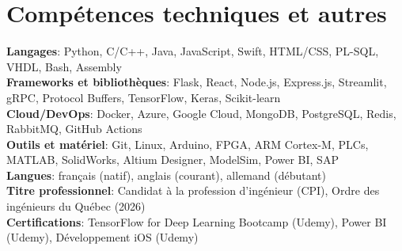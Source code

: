 \documentclass[letterpaper,12pt]{article}
\begin{document}
\section{Comp\'{e}tences techniques et autres}
 \begin{itemize}[leftmargin=0.15in, label={}]
    \small{\item{
     \textbf{Langages}{: Python, C/C++, Java, JavaScript, Swift, HTML/CSS, PL-SQL, VHDL, Bash, Assembly} \\
     \textbf{Frameworks et biblioth\`{e}ques}{: Flask, React, Node.js, Express.js, Streamlit, gRPC, Protocol Buffers, TensorFlow, Keras, Scikit-learn} \\
     \textbf{Cloud/DevOps}{: Docker, Azure, Google Cloud, MongoDB, PostgreSQL, Redis, RabbitMQ, GitHub Actions} \\
     \textbf{Outils et mat\'{e}riel}{: Git, Linux, Arduino, FPGA, ARM Cortex-M, PLCs, MATLAB, SolidWorks, Altium Designer, ModelSim, Power BI, SAP} \\
     \textbf{Langues}{: fran\c{c}ais (natif), anglais (courant), allemand (d\'{e}butant)} \\
     \textbf{Titre professionnel}{: Candidat \`{a} la profession d'ing\'{e}nieur (CPI), Ordre des ing\'{e}nieurs du Qu\'{e}bec (2026)} \\
     \textbf{Certifications}{: TensorFlow for Deep Learning Bootcamp (Udemy), Power BI (Udemy), D\'{e}veloppement iOS (Udemy)}
    }}
 \end{itemize}

\end{document}
